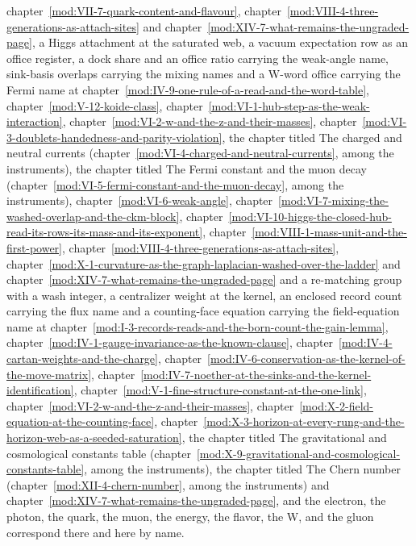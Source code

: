 \begin{chbridge}
chapter~\ref{mod:VII-7-quark-content-and-flavour}, chapter~\ref{mod:VIII-4-three-generations-as-attach-sites} and chapter~\ref{mod:XIV-7-what-remains-the-ungraded-page}, a Higgs attachment at the saturated web, a vacuum expectation row as an office register, a dock share and an office ratio carrying the weak-angle name, sink-basis overlaps carrying the mixing names and a W-word office carrying the Fermi name at chapter~\ref{mod:IV-9-one-rule-of-a-read-and-the-word-table}, chapter~\ref{mod:V-12-koide-class}, chapter~\ref{mod:VI-1-hub-step-as-the-weak-interaction}, chapter~\ref{mod:VI-2-w-and-the-z-and-their-masses}, chapter~\ref{mod:VI-3-doublets-handedness-and-parity-violation}, the chapter titled The charged and neutral currents (chapter~\ref{mod:VI-4-charged-and-neutral-currents}, among the instruments), the chapter titled The Fermi constant and the muon decay (chapter~\ref{mod:VI-5-fermi-constant-and-the-muon-decay}, among the instruments), chapter~\ref{mod:VI-6-weak-angle}, chapter~\ref{mod:VI-7-mixing-the-washed-overlap-and-the-ckm-block}, chapter~\ref{mod:VI-10-higgs-the-closed-hub-read-its-rows-its-mass-and-its-exponent}, chapter~\ref{mod:VIII-1-mass-unit-and-the-first-power}, chapter~\ref{mod:VIII-4-three-generations-as-attach-sites}, chapter~\ref{mod:X-1-curvature-as-the-graph-laplacian-washed-over-the-ladder} and chapter~\ref{mod:XIV-7-what-remains-the-ungraded-page} and a re-matching group with a wash integer, a centralizer weight at the kernel, an enclosed record count carrying the flux name and a counting-face equation carrying the field-equation name at chapter~\ref{mod:I-3-records-reads-and-the-born-count-the-gain-lemma}, chapter~\ref{mod:IV-1-gauge-invariance-as-the-known-clause}, chapter~\ref{mod:IV-4-cartan-weights-and-the-charge}, chapter~\ref{mod:IV-6-conservation-as-the-kernel-of-the-move-matrix}, chapter~\ref{mod:IV-7-noether-at-the-sinks-and-the-kernel-identification}, chapter~\ref{mod:V-1-fine-structure-constant-at-the-one-link}, chapter~\ref{mod:VI-2-w-and-the-z-and-their-masses}, chapter~\ref{mod:X-2-field-equation-at-the-counting-face}, chapter~\ref{mod:X-3-horizon-at-every-rung-and-the-horizon-web-as-a-seeded-saturation}, the chapter titled The gravitational and cosmological constants table (chapter~\ref{mod:X-9-gravitational-and-cosmological-constants-table}, among the instruments), the chapter titled The Chern number (chapter~\ref{mod:XII-4-chern-number}, among the instruments) and chapter~\ref{mod:XIV-7-what-remains-the-ungraded-page}, and the electron, the photon, the quark, the muon, the energy, the flavor, the W, and the gluon correspond there and here by name.
\end{chbridge}
